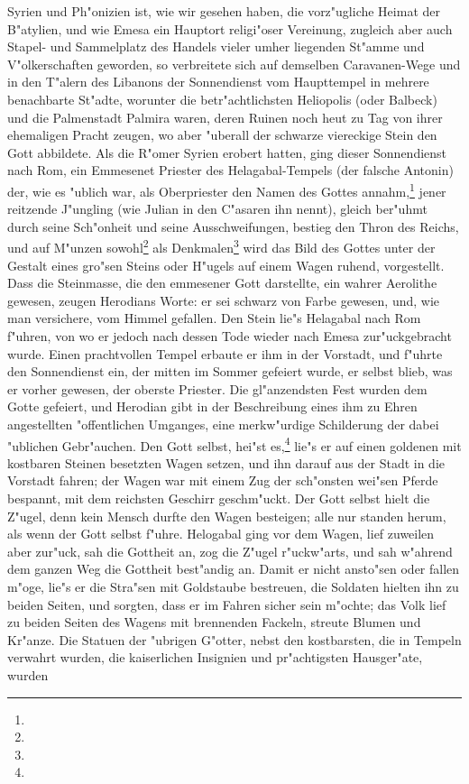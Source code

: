 \documentclass[a4paper, 11pt, oneside, polutonikogreek, german]{article}
\begin{document}
Syrien und Ph"onizien ist, wie wir gesehen haben, die vorz"ugliche Heimat der B"atylien, und wie Emesa ein Hauptort religi"oser Vereinung, zugleich aber auch Stapel- und Sammelplatz des Handels vieler umher liegenden St"amme und V"olkerschaften geworden, so verbreitete sich auf demselben Caravanen-Wege und in den T"alern des Libanons der Sonnendienst vom Haupttempel in mehrere benachbarte St"adte, worunter die betr"achtlichsten Heliopolis (oder Balbeck) und die Palmenstadt Palmira waren, deren Ruinen noch heut zu Tag von ihrer ehemaligen Pracht zeugen, wo aber "uberall der schwarze viereckige Stein den Gott abbildete. Als die R"omer Syrien erobert hatten, ging dieser Sonnendienst nach Rom, ein Emmesenet Priester des Helagabal-Tempels (der falsche Antonin) der, wie es "ublich war, als Oberpriester den Namen des Gottes annahm,\footnote{} jener reitzende J"ungling (wie Julian in den C"asaren ihn nennt), gleich ber"uhmt durch seine Sch"onheit und seine Ausschweifungen, bestieg den Thron des Reichs, und auf M"unzen sowohl\footnote{} als Denkmalen\footnote{} wird das Bild des Gottes unter der Gestalt eines gro"sen Steins oder H"ugels auf einem Wagen ruhend, vorgestellt. Dass die Steinmasse, die den emmesener Gott darstellte, ein wahrer Aerolithe gewesen, zeugen Herodians Worte: er sei schwarz von Farbe gewesen, und, wie man versichere, vom Himmel gefallen. Den Stein lie"s Helagabal nach Rom f"uhren, von wo er jedoch nach dessen Tode wieder nach Emesa zur"uckgebracht wurde. Einen prachtvollen Tempel erbaute er ihm in der Vorstadt, und f"uhrte den Sonnendienst ein, der mitten im Sommer gefeiert wurde, er selbst blieb, was er vorher gewesen, der oberste Priester. Die gl"anzendsten Fest wurden dem Gotte gefeiert, und Herodian gibt in der Beschreibung eines ihm zu Ehren angestellten "offentlichen Umganges, eine merkw"urdige Schilderung der dabei "ublichen Gebr"auchen. Den Gott selbst, hei"st es,\footnote{} lie"s er auf einen goldenen mit kostbaren Steinen besetzten Wagen setzen, und ihn darauf aus der Stadt in die Vorstadt fahren; der Wagen war mit einem Zug der sch"onsten wei"sen Pferde bespannt, mit dem reichsten Geschirr geschm"uckt. Der Gott selbst hielt die Z"ugel, denn kein Mensch durfte den Wagen besteigen; alle nur standen herum, als wenn der Gott selbst f"uhre. Helogabal ging vor dem Wagen, lief zuweilen aber zur"uck, sah die Gottheit an, zog die Z"ugel r"uckw"arts, und sah w"ahrend dem ganzen Weg die Gottheit best"andig an. Damit er nicht ansto"sen oder fallen m"oge, lie"s er die Stra"sen mit Goldstaube bestreuen, die Soldaten hielten ihn zu beiden Seiten, und sorgten, dass er im Fahren sicher sein m"ochte; das Volk lief zu beiden Seiten des Wagens mit brennenden Fackeln, streute Blumen und Kr"anze. Die Statuen der "ubrigen G"otter, nebst den kostbarsten, die in Tempeln verwahrt wurden, die kaiserlichen Insignien und pr"achtigsten Hausger"ate, wurden 
\end{document}
